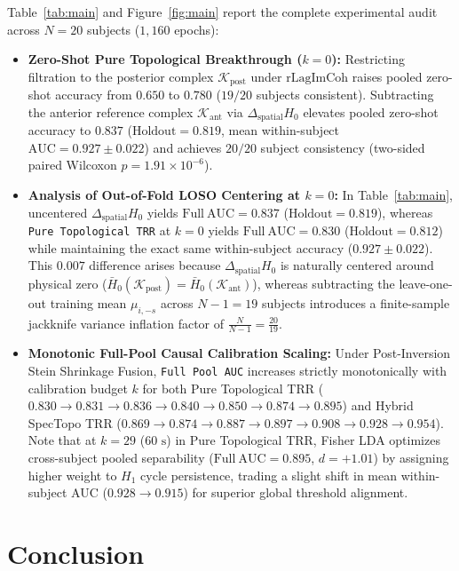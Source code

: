 \documentclass[10pt,twocolumn]{article}
\begin{document}
Table~\ref{tab:main} and Figure~\ref{fig:main} report the complete experimental audit across $N=20$ subjects ($1{,}160$ epochs):
\begin{itemize}
    \item \textbf{Zero-Shot Pure Topological Breakthrough ($k=0$):} Restricting filtration to the posterior complex $\mathcal{K}_{\mathrm{post}}$ under $\mathrm{rLagImCoh}$ raises pooled zero-shot accuracy from $0.650$ to $0.780$ ($19/20$ subjects consistent). Subtracting the anterior reference complex $\mathcal{K}_{\mathrm{ant}}$ via $\Delta_{\mathrm{spatial}} H_0$ elevates pooled zero-shot accuracy to $\mathbf{0.837}$ ($\mathrm{Holdout} = 0.819$, mean within-subject $\mathrm{AUC} = \mathbf{0.927 \pm 0.022}$) and achieves $20/20$ subject consistency (two-sided paired Wilcoxon $p = 1.91 \times 10^{-6}$).
    \item \textbf{Analysis of Out-of-Fold LOSO Centering at $k=0$:} In Table~\ref{tab:main}, uncentered $\Delta_{\mathrm{spatial}} H_0$ yields $\mathrm{Full\ AUC} = 0.837$ ($\mathrm{Holdout} = 0.819$), whereas \texttt{Pure Topological TRR} at $k=0$ yields $\mathrm{Full\ AUC} = 0.830$ ($\mathrm{Holdout} = 0.812$) while maintaining the exact same within-subject accuracy ($0.927 \pm 0.022$). This $0.007$ difference arises because $\Delta_{\mathrm{spatial}} H_0$ is naturally centered around physical zero ($\bar{H}_0(\mathcal{K}_{\mathrm{post}}) = \bar{H}_0(\mathcal{K}_{\mathrm{ant}})$), whereas subtracting the leave-one-out training mean $\mu_{i,-s}$ across $N-1=19$ subjects introduces a finite-sample jackknife variance inflation factor of $\frac{N}{N-1} = \frac{20}{19}$.
    \item \textbf{Monotonic Full-Pool Causal Calibration Scaling:} Under Post-Inversion Stein Shrinkage Fusion, \texttt{Full Pool AUC} increases strictly monotonically with calibration budget $k$ for both Pure Topological TRR ($0.830 \to 0.831 \to 0.836 \to 0.840 \to 0.850 \to 0.874 \to 0.895$) and Hybrid SpecTopo TRR ($0.869 \to 0.874 \to 0.887 \to 0.897 \to 0.908 \to 0.928 \to 0.954$). Note that at $k=29$ ($60\text{ s}$) in Pure Topological TRR, Fisher LDA optimizes cross-subject pooled separability ($\mathrm{Full\ AUC} = 0.895$, $d = +1.01$) by assigning higher weight to $H_1$ cycle persistence, trading a slight shift in mean within-subject AUC ($0.928 \to 0.915$) for superior global threshold alignment.
\end{itemize}

\section{Conclusion}
\end{document}
